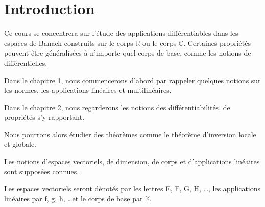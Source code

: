 \chapter*{Introduction}

Ce cours se concentrera sur l'étude des applications différentiables dans les
espaces de Banach construits sur le corps $\mathbb{R}$ ou le corps $\mathbb{C}$.
Certaines propriétés peuvent être généralisées à n'importe quel corps de base,
comme les notions de différentielles.

Dans le chapitre 1, nous commencerons d'abord par rappeler quelques notions sur
les normes, les applications linéaires et multilinéaires.

Dans le chapitre 2, nous regarderons les notions des différentiabilités, de propriétés s'y
rapportant.

Nous pourrons alors étudier des théorèmes comme le théorème d'inversion locale
et globale.

Les notions d'espaces vectoriels, de dimension, de corps et d'applications
linéaires sont supposées connues.

Les espaces vectoriels seront dénotés par les lettres E, F, G, H, \ldots, les
applications linéaires par f, g, h, \ldots et le corps de base par $\mathbb{K}$.
